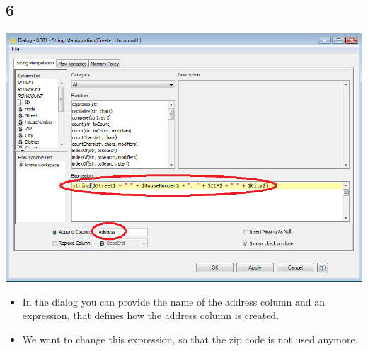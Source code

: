 \documentclass{beamer}
\begin{document}
\subsection{6}
\begin{frame}
	\begin{center}
  		\includegraphics[height=0.6\textheight]{6.png}
	\end{center}
	\begin{itemize}
		\item In the dialog you can provide the name of the address column and an expression, that defines how the address column is created.
		\item We want to change this expression, so that the zip code is not used anymore.		
	\end{itemize}
\end{frame}
\end{document}
